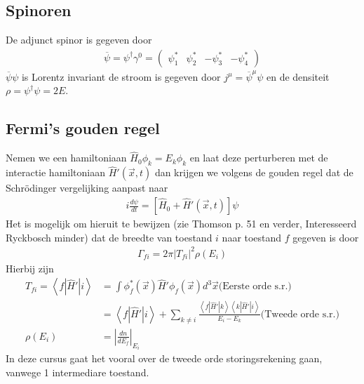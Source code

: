 \documentclass[../main.tex]{subfiles}
\begin{document}
\subsection{Spinoren}%
\label{sub:spinoren}

De adjunct spinor is gegeven door
\begin{equation}
    \begin{aligned}
        \label{eq:adj_dirac_spinor}
        \overline \psi = \psi^\dagger\gamma^0 =
        \begin{pmatrix}
            \psi_1^* & \psi_2^* & -\psi_3^* & -\psi_4^*
        \end{pmatrix}
    \end{aligned}
\end{equation}
$\overline \psi \psi$ is Lorentz invariant de stroom is gegeven door $j^\mu = \overline \psi ^\mu \psi$ en de densiteit $\rho = \psi^\dagger\psi = 2E$.

\subsection{Fermi's gouden regel}%
\label{sub:fermi_s_gouden_regel}

Nemen we een hamiltoniaan $\hat{H}_0\phi_k=E_k\phi_k$ en laat deze perturberen met de interactie hamiltoniaan $\hat{H}'(\vec{x},t)$ dan krijgen we volgens de gouden regel dat de Schrödinger vergelijking aanpast naar
\begin{equation}
    \begin{aligned}
        \label{eq:fermi_pert}
        i \frac{d\psi}{dt} = [\hat{H}_0 + \hat{H}'(\vec{x},t)]\psi
    \end{aligned}
\end{equation}
Het is mogelijk om hieruit te bewijzen (zie Thomson p. 51 en verder, Interesseerd Ryckbosch minder) dat de breedte van toestand $i$ naar toestand $f$ gegeven is door
\begin{equation}
    \begin{aligned}
        \label{eq:fermi_gouden_regel}
        \Gamma_{fi}=2\pi|T_{fi}|^2\rho(E_i)
    \end{aligned}
\end{equation}
Hierbij zijn
\begin{equation}
    \begin{aligned}
        \label{eq:fermi_par}
        T_{fi}=\left<f|\hat{H}'|i\right> &= \int \phi_f^*(\vec{x})\hat{H}'\phi_f(\vec{x})d^3\vec{x} \text{(Eerste orde s.r.)}\\
                                         &= \left<f|\hat{H}'|i\right> + \sum_{k\neq i} \frac{\left<f|\hat{H}'|k\right>\left<k|\hat{H}'|i\right>}{E_i-E_k} \text{(Tweede orde s.r.)}\\
        \rho(E_i)&=\left| \frac{dn}{dE_f} \right|_{E_i}
    \end{aligned}
\end{equation}
In deze cursus gaat het vooral over de tweede orde storingsrekening gaan, vanwege 1 intermediare toestand.
\end{document}
